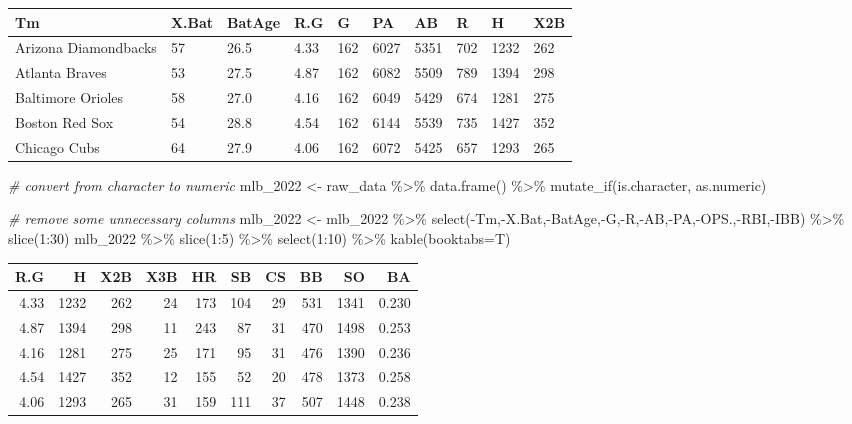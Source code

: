 \documentclass[
  11pt,
]{book}
\newenvironment{Shaded}{\begin{snugshade}}{\end{snugshade}}
\newcommand{\AttributeTok}[1]{\textcolor[rgb]{0.77,0.63,0.00}{#1}}
\newcommand{\CommentTok}[1]{\textcolor[rgb]{0.56,0.35,0.01}{\textit{#1}}}
\newcommand{\DecValTok}[1]{\textcolor[rgb]{0.00,0.00,0.81}{#1}}
\newcommand{\FunctionTok}[1]{\textcolor[rgb]{0.00,0.00,0.00}{#1}}
\newcommand{\NormalTok}[1]{#1}
\newcommand{\OtherTok}[1]{\textcolor[rgb]{0.56,0.35,0.01}{#1}}
\newcommand{\SpecialCharTok}[1]{\textcolor[rgb]{0.00,0.00,0.00}{#1}}
\theoremstyle{definition}
\theoremstyle{definition}
\theoremstyle{definition}
\theoremstyle{definition}
\theoremstyle{remark}
\begin{document}
\begin{tabular}{llllllllll}
\toprule
Tm & X.Bat & BatAge & R.G & G & PA & AB & R & H & X2B\\
\midrule
Arizona Diamondbacks & 57 & 26.5 & 4.33 & 162 & 6027 & 5351 & 702 & 1232 & 262\\
Atlanta Braves & 53 & 27.5 & 4.87 & 162 & 6082 & 5509 & 789 & 1394 & 298\\
Baltimore Orioles & 58 & 27.0 & 4.16 & 162 & 6049 & 5429 & 674 & 1281 & 275\\
Boston Red Sox & 54 & 28.8 & 4.54 & 162 & 6144 & 5539 & 735 & 1427 & 352\\
Chicago Cubs & 64 & 27.9 & 4.06 & 162 & 6072 & 5425 & 657 & 1293 & 265\\
\bottomrule
\end{tabular}

\begin{Shaded}
\begin{Highlighting}[]
\CommentTok{\# convert from character to numeric}
\NormalTok{mlb\_2022 }\OtherTok{\textless{}{-}}\NormalTok{ raw\_data }\SpecialCharTok{\%\textgreater{}\%} \FunctionTok{data.frame}\NormalTok{() }\SpecialCharTok{\%\textgreater{}\%} \FunctionTok{mutate\_if}\NormalTok{(is.character, as.numeric)}

\CommentTok{\# remove some unnecessary columns}
\NormalTok{mlb\_2022 }\OtherTok{\textless{}{-}}\NormalTok{ mlb\_2022 }\SpecialCharTok{\%\textgreater{}\%} \FunctionTok{select}\NormalTok{(}\SpecialCharTok{{-}}\NormalTok{Tm,}\SpecialCharTok{{-}}\NormalTok{X.Bat,}\SpecialCharTok{{-}}\NormalTok{BatAge,}\SpecialCharTok{{-}}\NormalTok{G,}\SpecialCharTok{{-}}\NormalTok{R,}\SpecialCharTok{{-}}\NormalTok{AB,}\SpecialCharTok{{-}}\NormalTok{PA,}\SpecialCharTok{{-}}\NormalTok{OPS.,}\SpecialCharTok{{-}}\NormalTok{RBI,}\SpecialCharTok{{-}}\NormalTok{IBB) }\SpecialCharTok{\%\textgreater{}\%} \FunctionTok{slice}\NormalTok{(}\DecValTok{1}\SpecialCharTok{:}\DecValTok{30}\NormalTok{)}
\NormalTok{mlb\_2022 }\SpecialCharTok{\%\textgreater{}\%} \FunctionTok{slice}\NormalTok{(}\DecValTok{1}\SpecialCharTok{:}\DecValTok{5}\NormalTok{) }\SpecialCharTok{\%\textgreater{}\%} \FunctionTok{select}\NormalTok{(}\DecValTok{1}\SpecialCharTok{:}\DecValTok{10}\NormalTok{) }\SpecialCharTok{\%\textgreater{}\%} \FunctionTok{kable}\NormalTok{(}\AttributeTok{booktabs=}\NormalTok{T)}
\end{Highlighting}
\end{Shaded}

\begin{tabular}{rrrrrrrrrr}
\toprule
R.G & H & X2B & X3B & HR & SB & CS & BB & SO & BA\\
\midrule
4.33 & 1232 & 262 & 24 & 173 & 104 & 29 & 531 & 1341 & 0.230\\
4.87 & 1394 & 298 & 11 & 243 & 87 & 31 & 470 & 1498 & 0.253\\
4.16 & 1281 & 275 & 25 & 171 & 95 & 31 & 476 & 1390 & 0.236\\
4.54 & 1427 & 352 & 12 & 155 & 52 & 20 & 478 & 1373 & 0.258\\
4.06 & 1293 & 265 & 31 & 159 & 111 & 37 & 507 & 1448 & 0.238\\
\bottomrule
\end{tabular}
\end{document}
